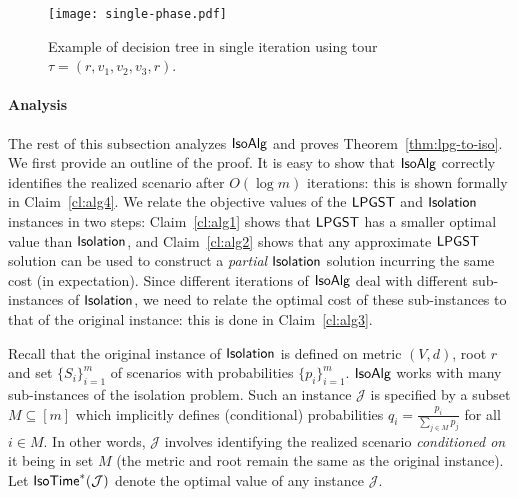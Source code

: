 \documentclass[11pt]{article}
\def\sse{\subseteq}
\def\js{\ensuremath{\mathcal{J}}}
\def\iso{\ensuremath{{\sf IsoAlg}}\xspace}
\def\isoprob{\ensuremath{{\sf Isolation}}\xspace}
\def\isotime{\ensuremath{{\sf IsoTime}}}
\def\isoopt{{\isotime}^*}
\def\lpgst{\ensuremath{{\sf LPGST}}\xspace}
\begin{document}
\begin{figure}
\begin{center}
\texttt{[image: single-phase.pdf]}
 \end{center}
\caption{\label{fig:single-phase} Example of decision tree in  single iteration using tour $\tau=(r,v_1,v_2,v_3,r)$.}
\end{figure}






\paragraph{Analysis} The rest of this subsection analyzes \iso and proves  Theorem~\ref{thm:lpg-to-iso}.  
We first provide an  outline of the proof. It is easy to show that \iso correctly identifies the realized
scenario after $O(\log m)$ iterations: this is shown formally in Claim~\ref{cl:alg4}. We relate the objective values of 
the \lpgst and \isoprob instances in two steps: Claim~\ref{cl:alg1} shows that \lpgst has a smaller optimal value than \isoprob,  
and Claim~\ref{cl:alg2} shows that any approximate \lpgst solution can be used to construct a {\em partial} \isoprob solution incurring the same cost (in expectation). Since different iterations of \iso deal with different sub-instances of \isoprob, we need to relate the optimal cost of these sub-instances to that of the original instance: this is done in Claim~\ref{cl:alg3}.




Recall that the original instance of \isoprob is defined on metric $(V,d)$, root $r$ and set $\{S_i\}_{i=1}^m$ of scenarios with probabilities $\{p_i\}_{i=1}^m$. \iso works with many sub-instances of the isolation problem. Such an instance $\js$ is specified by a subset $M\sse[m]$ which implicitly defines (conditional) probabilities $q_i=\frac{p_i}{\sum_{j\in M}p_j}$ for all $i\in M$. In other words, $\js$ involves identifying the realized scenario {\em conditioned on} it being in set $M$ (the metric and root remain the same as the original instance). Let $\isoopt(\js)$ denote the optimal value of any instance \js.
\end{document}
